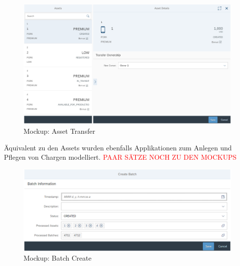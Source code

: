 \begin{figure}[H]
	\centering
	\includegraphics[width=1\linewidth]{pictures/ui-transfer-asset}
	\caption[Mockup: Asset Transfer]{Mockup: Asset Transfer}
	\label{fig:ui-transfer-asset}
\end{figure}

Äquivalent zu den Assets wurden ebenfalls Applikationen zum Anlegen und Pflegen von Chargen modelliert. \textcolor{red}{PAAR SÄTZE NOCH ZU DEN MOCKUPS}

\begin{figure}[H]
	\centering
	\includegraphics[width=1\linewidth]{pictures/ui-create-batch}
	\caption[Mockup: Batch Create]{Mockup: Batch Create}
	\label{fig:ui-create-batch}
\end{figure}



